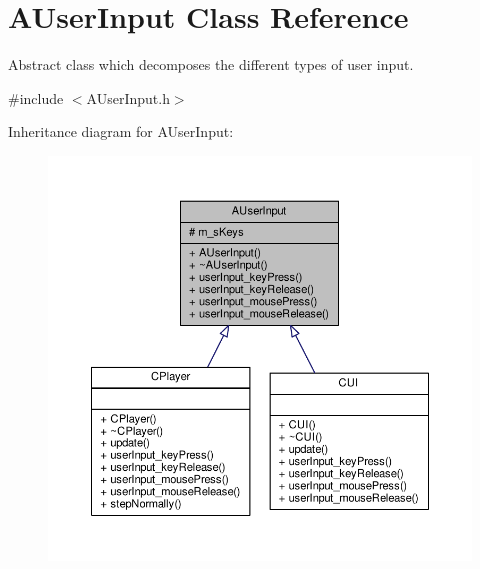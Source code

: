 \hypertarget{classAUserInput}{\section{A\-User\-Input Class Reference}
\label{classAUserInput}
}


Abstract class which decomposes the different types of user input.  




{\ttfamily \#include $<$A\-User\-Input.\-h$>$}



Inheritance diagram for A\-User\-Input\-:
\nopagebreak
\begin{figure}[H]
\begin{center}
\leavevmode
\includegraphics[width=350pt]{classAUserInput__inherit__graph}
\end{center}
\end{figure}


